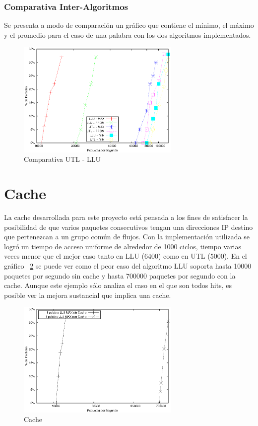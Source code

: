 \newpage
\subsubsection{Comparativa Inter-Algoritmos}
Se presenta a modo de comparación un gráfico que contiene el mínimo, el máximo y el promedio para el caso de una palabra con los dos algoritmos implementados. 
\begin{figure}[!h]
  \centering
	\includegraphics[width=0.7\textwidth]{5-resultados/graf/lluvsutl.eps}
  \caption{Comparativa UTL - LLU}
  \label{figvs}
\end{figure}


\newpage
\section{Cache}

La cache desarrollada para este proyecto está pensada a los fines de satisfacer la posibilidad de que varios paquetes consecutivos tengan una direcciones IP destino que pertenezcan a un grupo común de flujos. Con la implementación utilizada se logró un tiempo de acceso uniforme de alrededor de 1000 ciclos, tiempo varias veces menor que el mejor caso tanto en LLU (6400) como en UTL (5000). En el gráfico ~\ref{fig:cachecomp} se puede ver como el peor caso del algoritmo LLU soporta hasta 10000 paquetes por segundo sin cache y hasta 700000 paquetes por segundo con la cache. Aunque este ejemplo sólo analiza el caso en el que son todos hits, es posible ver la mejora sustancial que implica una cache. 

\begin{figure}[!h]
  \centering
	\includegraphics[width=0.7\textwidth]{5-resultados/graf/cachecomp.eps}
  \caption{Cache }
  \label{fig:cachecomp}
\end{figure}

